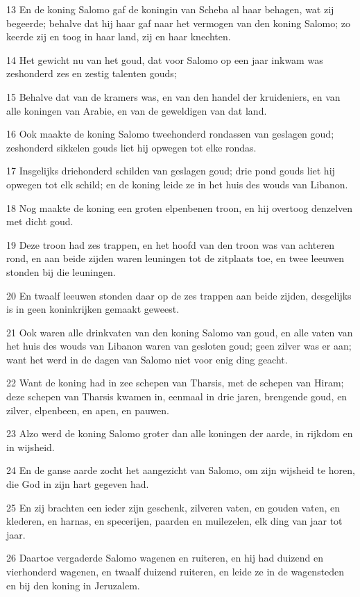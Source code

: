 \par 13 En de koning Salomo gaf de koningin van Scheba al haar behagen, wat zij begeerde; behalve dat hij haar gaf naar het vermogen van den koning Salomo; zo keerde zij en toog in haar land, zij en haar knechten.
\par 14 Het gewicht nu van het goud, dat voor Salomo op een jaar inkwam was zeshonderd zes en zestig talenten gouds;
\par 15 Behalve dat van de kramers was, en van den handel der kruideniers, en van alle koningen van Arabie, en van de geweldigen van dat land.
\par 16 Ook maakte de koning Salomo tweehonderd rondassen van geslagen goud; zeshonderd sikkelen gouds liet hij opwegen tot elke rondas.
\par 17 Insgelijks driehonderd schilden van geslagen goud; drie pond gouds liet hij opwegen tot elk schild; en de koning leide ze in het huis des wouds van Libanon.
\par 18 Nog maakte de koning een groten elpenbenen troon, en hij overtoog denzelven met dicht goud.
\par 19 Deze troon had zes trappen, en het hoofd van den troon was van achteren rond, en aan beide zijden waren leuningen tot de zitplaats toe, en twee leeuwen stonden bij die leuningen.
\par 20 En twaalf leeuwen stonden daar op de zes trappen aan beide zijden, desgelijks is in geen koninkrijken gemaakt geweest.
\par 21 Ook waren alle drinkvaten van den koning Salomo van goud, en alle vaten van het huis des wouds van Libanon waren van gesloten goud; geen zilver was er aan; want het werd in de dagen van Salomo niet voor enig ding geacht.
\par 22 Want de koning had in zee schepen van Tharsis, met de schepen van Hiram; deze schepen van Tharsis kwamen in, eenmaal in drie jaren, brengende goud, en zilver, elpenbeen, en apen, en pauwen.
\par 23 Alzo werd de koning Salomo groter dan alle koningen der aarde, in rijkdom en in wijsheid.
\par 24 En de ganse aarde zocht het aangezicht van Salomo, om zijn wijsheid te horen, die God in zijn hart gegeven had.
\par 25 En zij brachten een ieder zijn geschenk, zilveren vaten, en gouden vaten, en klederen, en harnas, en specerijen, paarden en muilezelen, elk ding van jaar tot jaar.
\par 26 Daartoe vergaderde Salomo wagenen en ruiteren, en hij had duizend en vierhonderd wagenen, en twaalf duizend ruiteren, en leide ze in de wagensteden en bij den koning in Jeruzalem.

